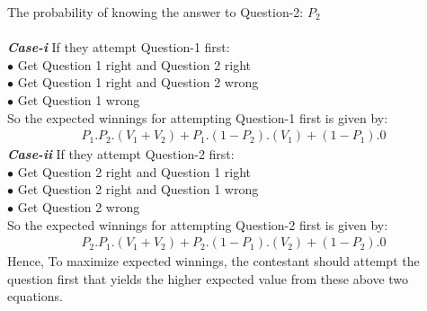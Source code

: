 \documentclass{article}
\begin{document}
\begin{enumerate}
  The probability of knowing the answer to Question-2: \(P_2\)\\\\
  \textbf{\textit{Case-i}} If they attempt Question-1 first:\\
  $\bullet$ Get Question 1 right and Question 2 right\\
  $\bullet$ Get Question 1 right and Question 2 wrong\\
  $\bullet$ Get Question 1 wrong\\
  So the expected winnings for attempting Question-1 first is given by:
  \begin{align*}
    P_1.P_2.\left(V_1 + V_2\right) +  P_1.\left(1 - P_2\right).\left(V_1\right) + \left(1 - P_1\right).0
  \end{align*}
  \textbf{\textit{Case-ii}} If they attempt Question-2 first:\\
  $\bullet$ Get Question 2 right and Question 1 right\\
  $\bullet$ Get Question 2 right and Question 1 wrong\\
  $\bullet$ Get Question 2 wrong\\
  So the expected winnings for attempting Question-2 first is given by:
  \begin{align*}
    P_2.P_1.\left(V_1 + V_2\right) +  P_2.\left(1 - P_1\right).\left(V_2\right) + \left(1 - P_2\right).0
  \end{align*}
  Hence, To maximize expected winnings, the contestant should attempt the question first that yields the higher expected value from these above two equations.


\end{enumerate}
\end{document}
